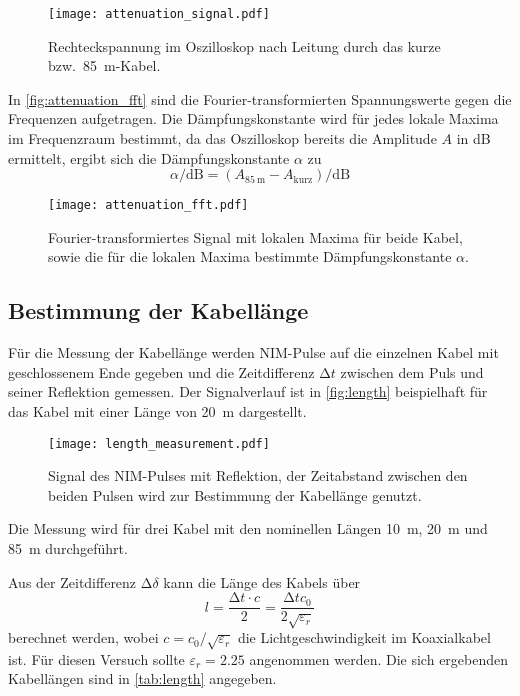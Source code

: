 \begin{figure}
  \centering
  \texttt{[image: attenuation\_signal.pdf]}
  \caption{%
    Rechteckspannung im Oszilloskop nach Leitung durch das kurze bzw.\ \SI{85}{\meter}-Kabel.%
  }\label{fig:attenuation_signal}
\end{figure}

In \autoref{fig:attenuation_fft} sind die Fourier-transformierten Spannungswerte gegen die Frequenzen aufgetragen.
Die Dämpfungskonstante wird für jedes lokale Maxima im Frequenzraum bestimmt,
da das Oszilloskop bereits die Amplitude $A$ in \si{\deci\bel} ermittelt, ergibt sich die Dämpfungskonstante $α$ zu
\begin{equation}
  α / \si{\deci\bel} = (A_{\SI{85}{\meter}} - A_\text{kurz}) / \si{\deci\bel}
\end{equation}

\begin{figure}
  \centering
  \texttt{[image: attenuation\_fft.pdf]}
  \caption{%
    Fourier-transformiertes Signal mit lokalen Maxima für beide Kabel, sowie die für die lokalen Maxima bestimmte Dämpfungskonstante $α$.
  }\label{fig:attenuation_fft}
\end{figure}

\subsection{Bestimmung der Kabellänge}

Für die Messung der Kabellänge werden NIM-Pulse auf die einzelnen Kabel mit geschlossenem Ende gegeben und die Zeitdifferenz $\increment t$ zwischen dem Puls und seiner Reflektion gemessen. 
Der Signalverlauf ist in \autoref{fig:length} beispielhaft für das Kabel mit einer Länge von \SI{20}{\meter} dargestellt.

\begin{figure}
  \centering
  \texttt{[image: length\_measurement.pdf]}
  \caption{%
    Signal des NIM-Pulses mit Reflektion, der Zeitabstand zwischen den beiden Pulsen wird zur Bestimmung der Kabellänge genutzt.
  }\label{fig:length}
\end{figure}

Die Messung wird für drei Kabel mit den nominellen Längen \SI{10}{\meter}, \SI{20}{\meter} und \SI{85}{\meter} durchgeführt.

Aus der Zeitdifferenz $\increment \delta$ kann die Länge des Kabels über
\begin{equation}
  l = \frac{\increment t \cdot c}{2} = \frac{\increment t c_0 }{2 \sqrt{ε_r}}
\end{equation}
berechnet werden, wobei $c = c_0 / \sqrt{ε_r}$ die Lichtgeschwindigkeit im Koaxialkabel ist.
Für diesen Versuch sollte $ε_r = \num{2.25}$ angenommen werden.
Die sich ergebenden Kabellängen sind in \autoref{tab:length} angegeben.
\begin{table}
  \centering
  \caption{%
    Laufzeitunterschied $\increment t$ und
    Kabellänge $l$ für die drei untersuchten Kabel
  }\label{tab:length}
  
\end{table}

